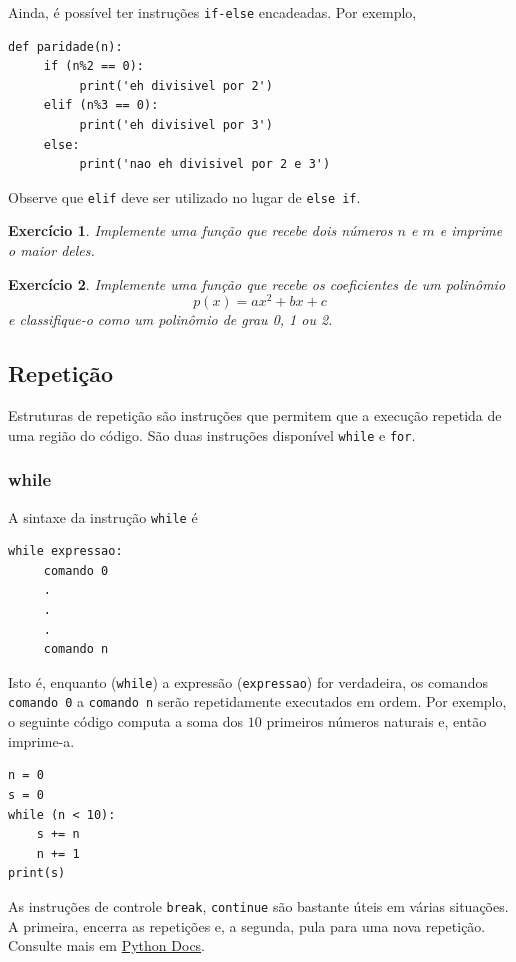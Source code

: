 \documentclass[12pt]{article}
\newtheorem{exr}{Exercício}[section]
\begin{document}
Ainda, é possível ter instruções \lstinline+if-else+ encadeadas. Por exemplo,
\begin{lstlisting}
def paridade(n):
     if (n%2 == 0):
          print('eh divisivel por 2')
     elif (n%3 == 0):
          print('eh divisivel por 3')
     else:
          print('nao eh divisivel por 2 e 3')    
\end{lstlisting}
Observe que \lstinline+elif+ deve ser utilizado no lugar de \lstinline+else if+.

\begin{exr}
  Implemente uma função que recebe dois números $n$ e $m$ e imprime o maior deles.
\end{exr}

\begin{exr}
  Implemente uma função que recebe os coeficientes de um polinômio
  \begin{equation}
    p(x) = ax^2 + bx + c
  \end{equation}
  e classifique-o como um polinômio de grau 0, 1 ou 2.
\end{exr}

\subsection{Repetição}

Estruturas de repetição são instruções que permitem que a execução repetida de uma região do código. São duas instruções disponível \lstinline+while+ e \lstinline+for+.

\subsubsection{while}

A sintaxe da instrução \lstinline+while+ é
\begin{lstlisting}
while expressao:
     comando 0
     .
     .
     .
     comando n
\end{lstlisting}
Isto é, enquanto (\lstinline+while+) a expressão (\lstinline+expressao+) for verdadeira, os comandos \lstinline+comando 0+ a \lstinline+comando n+ serão repetidamente executados em ordem. Por exemplo, o seguinte código computa a soma dos $10$ primeiros números naturais e, então imprime-a.
\begin{lstlisting}
n = 0
s = 0
while (n < 10):
    s += n
    n += 1
print(s)
\end{lstlisting}

\begin{obs}
  As instruções de controle \lstinline+break+, \lstinline+continue+ são bastante úteis em várias situações. A primeira, encerra as repetições e, a segunda, pula para uma nova repetição. Consulte mais em \href{https://docs.python.org/3/tutorial/controlflow.html\#break-and-continue-statements-and-else-clauses-on-loops}{Python Docs}.
\end{obs}
\end{document}
